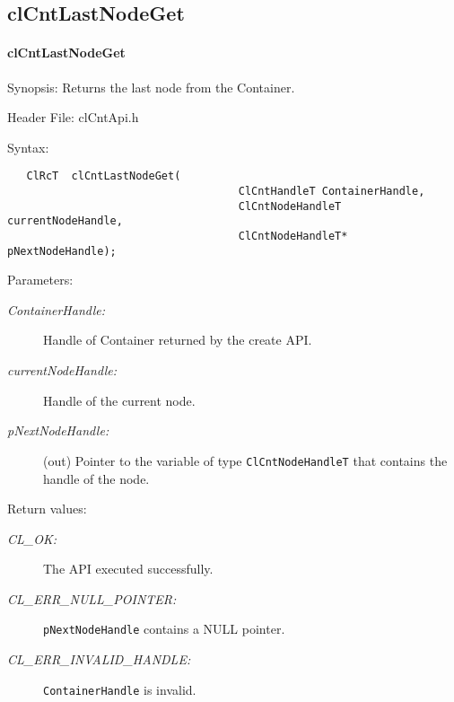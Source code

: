 \subsection{clCntLastNodeGet}
\hypertarget{pagecnt111}{}\paragraph{cl\-Cnt\-Last\-Node\-Get}\label{pagecnt111}
\begin{Desc}
\item[Synopsis:]Returns the last node from the Container.\end{Desc}
\begin{Desc}
\item[Header File:]clCntApi.h\end{Desc}
\begin{Desc}
\item[Syntax:]

\footnotesize\begin{verbatim}   ClRcT  clCntLastNodeGet(
                              		ClCntHandleT ContainerHandle,
                              		ClCntNodeHandleT  currentNodeHandle,
                              		ClCntNodeHandleT* pNextNodeHandle);
\end{verbatim}
\normalsize
\end{Desc}
\begin{Desc}
\item[Parameters:]
\begin{description}
\item[{\em Container\-Handle:}]Handle of Container returned by the create API. 
\item[{\em current\-Node\-Handle:}]Handle of the current node. 
\item[{\em p\-Next\-Node\-Handle:}](out) Pointer to the variable of type {\tt{Cl\-Cnt\-Node\-Handle\-T}} that contains 
the handle of the node.
\end{description}
\end{Desc}
\begin{Desc}
\item[Return values:]
\begin{description}
\item[{\em CL\_\-OK:}]The API executed successfully. 
\item[{\em CL\_\-ERR\_\-NULL\_\-POINTER:}]{\tt{pNextNodeHandle}} contains a NULL pointer. 
\item[{\em CL\_\-ERR\_\-INVALID\_\-HANDLE:}]{\tt{ContainerHandle}} is invalid.
\end{description}
\end{Desc}
